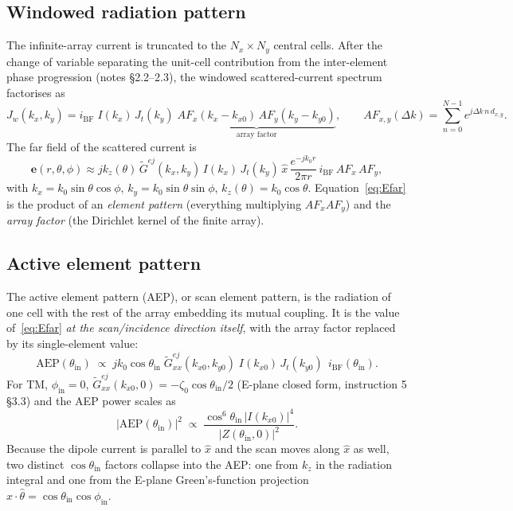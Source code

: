 \documentclass{article}
\begin{document}
\subsection{Windowed radiation pattern}

The infinite-array current is truncated to the $N_x\times N_y$ central cells. After the change of variable separating the unit-cell contribution from the inter-element phase progression (notes \S2.2--2.3), the windowed scattered-current spectrum factorises as
\begin{equation}\label{eq:Jw}
J_w(k_x,k_y) = i_{\text{BF}}\;I(k_x)\,J_t(k_y)\;\underbrace{AF_x(k_x-k_{x0})\,AF_y(k_y-k_{y0})}_{\text{array factor}}, \qquad
AF_{x,y}(\Delta k) = \sum_{n=0}^{N-1}e^{j\Delta k\,n\,d_{x,y}}.
\end{equation}
The far field of the scattered current is
\begin{equation}\label{eq:Efar}
\boldsymbol{e}(r,\theta,\phi) \approx jk_z(\theta)\,\widetilde{G}^{ej}(k_x,k_y)\,I(k_x)\,J_t(k_y)\,\hat{x}\,\frac{e^{-jk_0 r}}{2\pi r}\,i_{\text{BF}}\,AF_x\,AF_y,
\end{equation}
with $k_x = k_0\sin\theta\cos\phi$, $k_y = k_0\sin\theta\sin\phi$, $k_z(\theta) = k_0\cos\theta$. Equation~\eqref{eq:Efar} is the product of an \emph{element pattern} (everything multiplying $AF_xAF_y$) and the \emph{array factor} (the Dirichlet kernel of the finite array).

\subsection{Active element pattern}

The active element pattern (AEP), or scan element pattern, is the radiation of one cell with the rest of the array embedding its mutual coupling. It is the value of~\eqref{eq:Efar} \emph{at the scan/incidence direction itself}, with the array factor replaced by its single-element value:
\begin{equation}\label{eq:AEP}
\boxed{\;
\text{AEP}(\theta_{\text{in}}) \;\propto\; jk_0\cos\theta_{\text{in}}\;\widetilde{G}_{xx}^{ej}(k_{x0},k_{y0})\;I(k_{x0})\,J_t(k_{y0})\;\,i_{\text{BF}}(\theta_{\text{in}}).
\;}
\end{equation}
For TM, $\phi_{\text{in}}=0$, $\widetilde{G}_{xx}^{ej}(k_{x0},0) = -\zeta_0\cos\theta_{\text{in}}/2$ (E-plane closed form, instruction 5 \S3.3) and the AEP power scales as
\begin{equation}\label{eq:AEPpower}
\big|\text{AEP}(\theta_{\text{in}})\big|^2 \;\propto\; \frac{\cos^6\theta_{\text{in}}\,\big|I(k_{x0})\big|^4}{\big|Z(\theta_{\text{in}},0)\big|^2}.
\end{equation}
Because the dipole current is parallel to $\hat{x}$ and the scan moves along $\hat{x}$ as well, two distinct $\cos\theta_{\text{in}}$ factors collapse into the AEP: one from $k_z$ in the radiation integral and one from the E-plane Green's-function projection $\hat{x}\cdot\hat{\theta} = \cos\theta_{\text{in}}\cos\phi_{\text{in}}$.
\end{document}
